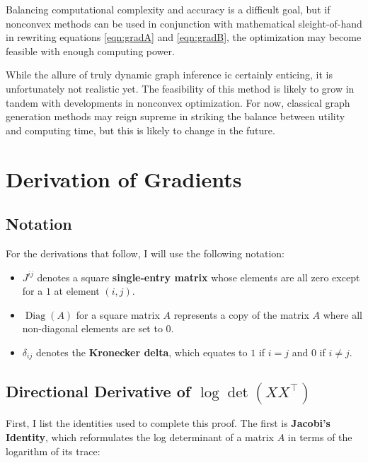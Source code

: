 \documentclass{article}
\theoremstyle{definition}
\DeclareMathOperator{\Diag}{Diag}
\begin{document}
Balancing computational complexity and accuracy is a difficult goal, but if nonconvex methods can be used in conjunction with mathematical sleight-of-hand in rewriting equations \ref{eqn:gradA} and \ref{eqn:gradB}, the optimization may become feasible with enough computing power. 

While the allure of truly dynamic graph inference ic certainly enticing, it is unfortunately not realistic yet. The feasibility of this method is likely to grow in tandem with developments in nonconvex optimization. For now, classical graph generation methods may reign supreme in striking the balance between utility and computing time, but this is likely to change in the future.



\newpage

\appendix

\section{Derivation of Gradients}

\subsection{Notation}

For the derivations that follow, I will use the following notation:

\begin{itemize}
    \item $J^{ij}$ denotes a square \textbf{single-entry matrix} whose elements are all zero except for a $1$ at element $(i,j)$.
    \item $\Diag(A)$ for a square matrix $A$ represents a copy of the matrix $A$ where all non-diagonal elements are set to $0$.
    \item $\delta_{ij}$ denotes the \textbf{Kronecker delta}, which equates to $1$ if $i = j$ and $0$ if $i \neq j$.
\end{itemize}

\subsection{Directional Derivative of $\log \det (XX^\top)$}
\label{subsec:gradLogDetDerivation}

First, I list the identities used to complete this proof. The first is \textbf{Jacobi's Identity}, which reformulates the log determinant of a matrix $A$ in terms of the logarithm of its trace:
\end{document}
